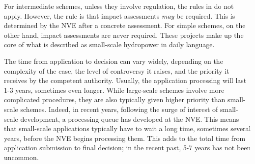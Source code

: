 For intermediate schemes, unless they involve regulation, the rules in \cite{wra17} do not apply. However, the rule is that impact assessments {\it may} be required. This is determined by the NVE after a concrete assessment. For simple schemes, on the other hand, impact assessments are never required. These projects make up the core of what is described as small-scale hydropower in daily language.

The time from application to decision can vary widely, depending on the complexity of the case, the level of controversy it raises, and the priority it receives by the competent authority. Usually, the application processing will last 1-3 years, sometimes even longer. While large-scale schemes involve more complicated procedures, they are also typically given higher priority than small-scale schemes. Indeed, in recent years, following the surge of interest of small-scale development, a processing queue has developed at the NVE. This means that small-scale applications typically have to wait a long time, sometimes several years, before the NVE begins processing them. This adds to the total time from application submission to final decision; in the recent past, 5-7 years has not been uncommon.

